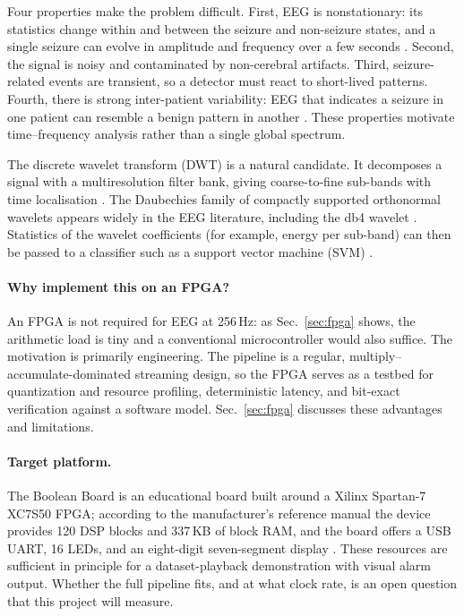 \documentclass[10pt,twocolumn,letterpaper]{article}
\begin{document}
Four properties make the problem difficult. First, EEG is nonstationary:
its statistics change within and between the seizure and non-seizure
states, and a single seizure can evolve in amplitude and frequency over
a few seconds \cite{shoeb2010icml}. Second, the signal is noisy and
contaminated by non-cerebral artifacts. Third, seizure-related events
are transient, so a detector must react to short-lived patterns. Fourth,
there is strong inter-patient variability: EEG that indicates a seizure
in one patient can resemble a benign pattern in another
\cite{shoeb2010icml}. These properties motivate time--frequency analysis
rather than a single global spectrum.

The discrete wavelet transform (DWT) is a natural candidate. It
decomposes a signal with a multiresolution filter bank, giving
coarse-to-fine sub-bands with time localisation \cite{mallat1989theory}.
The Daubechies family of compactly supported orthonormal wavelets
\cite{daubechies1988orthonormal} appears widely in the EEG literature,
including the db4 wavelet \cite{shen2022dwt,subasi2007eeg}. %
Statistics of the wavelet coefficients (for example, energy per
sub-band) can then be passed to a classifier such as a support vector
machine (SVM) \cite{cortes1995support}.

\paragraph{Why implement this on an FPGA?} An FPGA is not required for
EEG at 256\,Hz: as Sec.~\ref{sec:fpga} shows, the arithmetic load is
tiny and a conventional microcontroller would also suffice. The
motivation is primarily engineering. The pipeline is a regular,
multiply--accumulate-dominated streaming design, so the FPGA serves as a
testbed for quantization and resource profiling, deterministic latency,
and bit-exact verification against a software model.
Sec.~\ref{sec:fpga} discusses these advantages and limitations.

\paragraph{Target platform.} The Boolean Board is an educational board
built around a Xilinx Spartan-7 XC7S50 FPGA; according to the
manufacturer's reference manual the device provides 120 DSP blocks and
337\,KB of block RAM, and the board offers a USB UART, 16 LEDs, and an
eight-digit seven-segment display \cite{realdigital2024boolean}. These
resources are sufficient in principle for a dataset-playback
demonstration with visual alarm output. Whether the full pipeline fits,
and at what clock rate, is an open question that this project will
measure.
\end{document}
